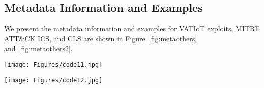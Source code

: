 \subsection{Metadata Information and Examples}\label{appendix:metadataother}

We present the metadata information and examples for VATIoT exploits, MITRE ATT\&CK ICS, and CLS are shown in Figure~\ref{fig:metaothers} and~\ref{fig:metaothers2}. 


\begin{figure*}
    \centering
    \texttt{[image: Figures/code11.jpg]}
    \caption{The metadata field information and examples for VARIoT exploits and MITRE ATT\&CK ICS.}
\label{fig:metaothers}
\end{figure*}


\begin{figure*}
    \centering
    \texttt{[image: Figures/code12.jpg]}
    \caption{The metadata field information and examples for CLS.}
\label{fig:metaothers2}
\end{figure*}

